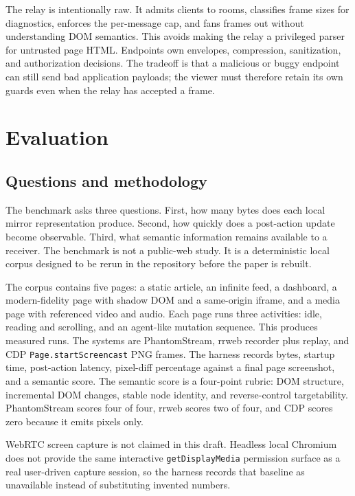 \documentclass[conference]{IEEEtran}
\newcommand{\code}[1]{\texttt{\small #1}}
\begin{document}
The relay is intentionally raw. It admits clients to rooms, classifies frame
sizes for diagnostics, enforces the per-message cap, and fans frames out without
understanding DOM semantics. This avoids making the relay a privileged parser for
untrusted page HTML. Endpoints own envelopes, compression, sanitization, and
authorization decisions. The tradeoff is that a malicious or buggy endpoint can
still send bad application payloads; the viewer must therefore retain its own
guards even when the relay has accepted a frame.

\section{Evaluation}

\subsection{Questions and methodology}

The benchmark asks three questions. First, how many bytes does each local mirror
representation produce. Second, how quickly does a post-action update become
observable. Third, what semantic information remains available to a receiver. The
benchmark is not a public-web study. It is a deterministic local corpus designed
to be rerun in the repository before the paper is rebuilt.

The corpus contains five pages: a static article, an infinite feed, a dashboard,
a modern-fidelity page with shadow DOM and a same-origin iframe, and a media page
with referenced video and audio. Each page runs three activities: idle, reading
and scrolling, and an agent-like mutation sequence. This produces
\PSBenchRunCount{} measured runs. The systems are PhantomStream, rrweb recorder
plus replay, and CDP \code{Page.startScreencast} PNG frames. The harness records
bytes, startup time, post-action latency, pixel-diff percentage against a final
page screenshot, and a semantic score. The semantic score is a four-point rubric:
DOM structure, incremental DOM changes, stable node identity, and reverse-control
targetability. PhantomStream scores four of four, rrweb scores two of four, and
CDP scores zero because it emits pixels only.

WebRTC screen capture is not claimed in this draft. Headless local Chromium does
not provide the same interactive \code{getDisplayMedia} permission surface as a
real user-driven capture session, so the harness records that baseline as
unavailable instead of substituting invented numbers.
\end{document}
